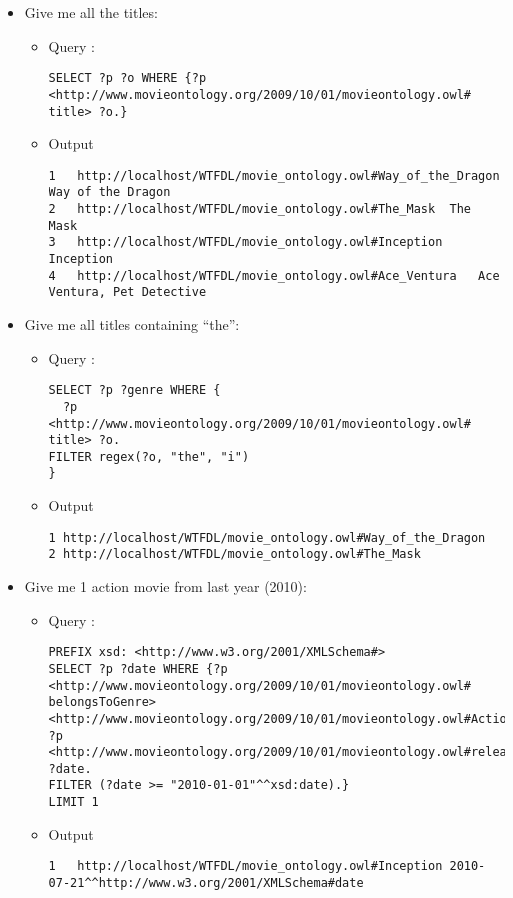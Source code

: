 \begin{itemize}

 \item Give me all the titles:
  \begin{itemize}
    \item Query : 
\begin{verbatim}
SELECT ?p ?o WHERE {?p <http://www.movieontology.org/2009/10/01/movieontology.owl#
title> ?o.}
\end{verbatim}
    \item Output
      \begin{lstlisting}
1	http://localhost/WTFDL/movie_ontology.owl#Way_of_the_Dragon	Way of the Dragon	
2	http://localhost/WTFDL/movie_ontology.owl#The_Mask	The Mask	
3	http://localhost/WTFDL/movie_ontology.owl#Inception	Inception	
4	http://localhost/WTFDL/movie_ontology.owl#Ace_Ventura	Ace Ventura, Pet Detective	
      \end{lstlisting}
    \end{itemize}

 \item Give me all titles containing ``the'':
  \begin{itemize}
    \item Query : 
\begin{verbatim}
SELECT ?p ?genre WHERE {
  ?p <http://www.movieontology.org/2009/10/01/movieontology.owl#
title> ?o.
FILTER regex(?o, "the", "i")
}
\end{verbatim}
    \item Output
      \begin{lstlisting}
1 http://localhost/WTFDL/movie_ontology.owl#Way_of_the_Dragon 
2 http://localhost/WTFDL/movie_ontology.owl#The_Mask  
      \end{lstlisting}
    \end{itemize}

 \item Give me 1 action movie from last year (2010):
  \begin{itemize}
    \item Query : 
\begin{verbatim}
PREFIX xsd: <http://www.w3.org/2001/XMLSchema#>
SELECT ?p ?date WHERE {?p <http://www.movieontology.org/2009/10/01/movieontology.owl#
belongsToGenre> <http://www.movieontology.org/2009/10/01/movieontology.owl#Action>.
?p <http://www.movieontology.org/2009/10/01/movieontology.owl#releasedate> ?date.
FILTER (?date >= "2010-01-01"^^xsd:date).}
LIMIT 1
\end{verbatim}
    \item Output
      \begin{lstlisting}
1	http://localhost/WTFDL/movie_ontology.owl#Inception	2010-07-21^^http://www.w3.org/2001/XMLSchema#date
      \end{lstlisting}
    \end{itemize}


\end{itemize}
